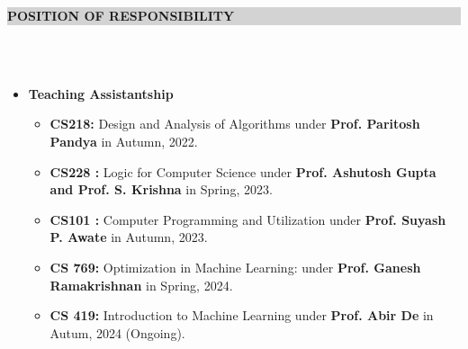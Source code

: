 \documentclass[a4paper,10.5pt]{article}
\newcommand{\lsep}{-0.5cm}
\newcommand{\resheading}[1]{{\small \colorbox{lightgray}{\begin{minipage}{0.975\textwidth}{\textbf{#1 \vphantom{p\^{E}}}}\end{minipage}}}}
\begin{document}
\vspace{0.1cm}
\resheading{\textbf{POSITION OF RESPONSIBILITY}}\\[\lsep] \\[-0.4cm]
\vspace{0.3cm}

\begin{itemize}[noitemsep,nolistsep]
\item \textbf{Teaching Assistantship}
\vspace{0.1cm}
\begin{itemize}[noitemsep,nolistsep]
    \item \textbf{CS218: } Design and Analysis of Algorithms under \textbf{Prof. Paritosh Pandya} in Autumn, 2022.
    \vspace{0.07cm}    
    \item \textbf{CS228 :} Logic for Computer Science under \textbf{Prof.  Ashutosh Gupta and Prof. S. Krishna} in Spring, 2023.
    \vspace{0.07cm}
    \item \textbf{CS101 :} Computer Programming and Utilization under \textbf{Prof. Suyash P. Awate} in Autumn, 2023.
    \vspace{0.07cm}
    \item \textbf{CS 769:}	Optimization in Machine Learning:  under \textbf{Prof. Ganesh Ramakrishnan} in Spring, 2024.
    \vspace{0.07cm}
    \item \textbf{CS 419:}	Introduction to Machine Learning  under \textbf{Prof. Abir De} in Autum, 2024 (Ongoing).
\end{itemize}

\end{itemize}
\end{document}
